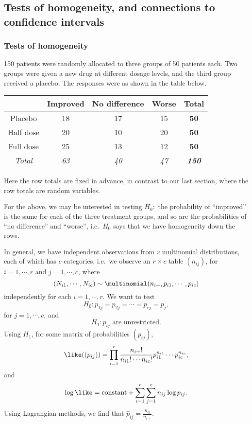\documentclass[a4paper]{article}
\begin{document}
\subsection{Tests of homogeneity, and connections to confidence intervals}
\subsubsection{Tests of homogeneity}
\begin{eg}
  150 patients were randomly allocated to three groups of 50 patients each. Two groups were given a new drug at different dosage levels, and the third group received a placebo. The responses were as shown in the table below.
  \begin{center}
    \begin{tabular}{ccccc}
      \toprule
      & Improved & No difference & Worse & \textbf{Total}\\\midrule
      Placebo & 18 & 17 & 15 & \textbf{50}\\
      Half dose & 20 & 10 & 20 & \textbf{50}\\
      Full dose & 25 & 13 & 12& \textbf{50}\\\midrule
      \textit{Total} & \textit{63} & \textit{40} & \textit{47} & \textbf{\textit{150}}\\\bottomrule
    \end{tabular}
  \end{center}
  Here the row totals are fixed in advance, in contrast to our last section, where the row totals are random variables.

  For the above, we may be interested in testing $H_0:$ the probability of ``improved'' is the same for each of the three treatment groups, and so are the probabilities of ``no difference'' and ``worse'', i.e.\ $H_0$ says that we have homogeneity down the rows.
\end{eg}
In general, we have independent observations from $r$ multinomial distributions, each of which has $c$ categories, i.e.\ we observe an $r\times c$ table $(n_{ij})$, for $i = 1, \cdots, r$ and $j = 1, \cdots, c$, where
\[
  (N_{i1}, \cdots, N_{ic}) \sim \multinomial(n_{i+}, p_{i1}, \cdots, p_{ic})
\]
independently for each $i = 1, \cdots, r$.
We want to test
\[
  H_0: p_{1j} = p_{2j} = \cdots = p_{rj} = p_j,
\]
for $j = 1, \cdots, c$, and
\[
  H_1: p_{ij}\text{ are unrestricted}.
\]
Using $H_1$, for some matrix of probabilities $(p_{ij})$,
\[
  \like((p_{ij})) = \prod_{i = 1}^r \frac{n_{i+}!}{n_{i1}!\cdots n_{ic}!}p_{i1}^{n_{i1}} \cdots p_{ic}^{n_{ic}},
\]
and
\[
  \log\like = \text{constant} + \sum_{i = 1}^r \sum_{j = 1}^c n_{ij}\log p_{ij}.
\]
Using Lagrangian methods, we find that $\hat{p}_{ij} = \frac{n_{ij}}{n_{i+}}$.
\end{document}

